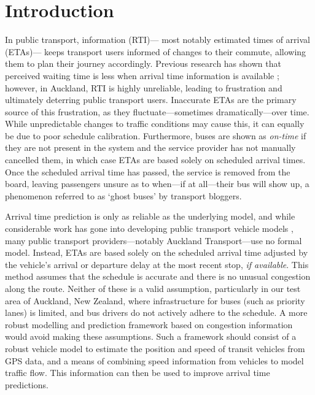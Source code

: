 \section{Introduction}
\label{sec:intro}


In public transport, \rt information (RTI)---%
most notably estimated times of arrival (ETAs)---%
keeps transport users informed of changes to their commute,
allowing them to plan their journey accordingly.
Previous research has shown that perceived waiting time is less
when arrival time information is available \citep{TCRP_2003b};
however, in Auckland, RTI is highly unreliable,
leading to frustration and ultimately deterring public transport users.
Inaccurate ETAs are the primary source of this frustration,
as they fluctuate---sometimes dramatically---over time.
While unpredictable changes to traffic conditions may cause this,
it can equally be due to poor schedule calibration.
Furthermore, buses are shown as \emph{on-time}
if they are not present in the \rt system and
the service provider has not manually cancelled them,
in which case ETAs are based solely on scheduled arrival times.
Once the scheduled arrival time has passed,
the service is removed from the \rt board,
leaving passengers unsure as to when---if at all---their bus will show up,
a phenomenon referred to as `ghost buses' by transport bloggers.


Arrival time prediction is only as reliable as the underlying model,
and while considerable work has gone into developing public transport vehicle models
\citep{Cathey_2003,Jeong_2005,Yu_2011,Hans_2015},
many public transport providers---notably Auckland Transport---use no formal model.
Instead, ETAs are based solely on the scheduled arrival time
adjusted by the vehicle's arrival or departure delay at the most recent stop,
\emph{if available}.
This method assumes that the schedule is accurate
and there is no unusual congestion along the route.
Neither of these is a valid assumption,
particularly in our test area of Auckland, New Zealand,
where infrastructure for buses (such as priority lanes) is limited,
and bus drivers do not actively adhere to the schedule.
A more robust modelling and prediction framework
based on \rt congestion information would avoid making these assumptions.
Such a framework should consist of a robust vehicle model to estimate the position and speed
of transit vehicles from \rt GPS data,
and a means of combining speed information from vehicles
to model traffic flow.
This information can then be used to improve arrival time predictions.


